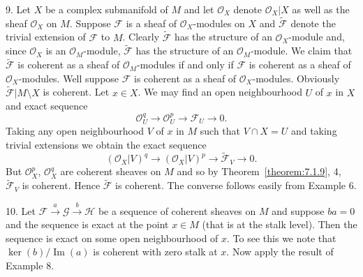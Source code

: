 9. Let $X$ be a complex submanifold of $M$ and let $\mathcal{O}_X$ denote $\mathcal{O}_X|X$ as well as the sheaf $\mathcal{O}_X$ on $M$. Suppose $\mathcal{F}$ is a sheaf of $\mathcal{O}_X$-modules on $X$ and $\widetilde{\mathcal{F}}$ denote the trivial extension of $\mathcal{F}$ to $M$. Clearly $\widetilde{\mathcal{F}}$ has the structure of an $\mathcal{O}_X$-module and, since $\mathcal{O}_X$ is an $\mathcal{O}_M$-module, $\widetilde{\mathcal{F}}$ has the structure of an $\mathcal{O}_M$-module. We claim that $\widetilde{\mathcal{F}}$ is coherent as a sheaf of $\mathcal{O}_M$-modules if and only if $\mathcal{F}$ is coherent as a sheaf of $\mathcal{O}_X$-modules. Well suppose $\mathcal{F}$ is coherent as a sheaf of $\mathcal{O}_X$-modules. Obviously $\widetilde{\mathcal{F}}|M\setminus X$ is coherent. Let $x\in X$. We may find an open neighbourhood $U$ of $x$ in $X$ and exact sequence
\[
\mathcal{O}_U^q\to\mathcal{O}_U^p\to\mathcal{F}_U\to0.
\]
Taking any open neighbourhood $V$ of $x$ in $M$ such that $V\cap X=U$ and taking trivial extensions we obtain the exact sequence
\[
(\mathcal{O}_X|V)^q\to(\mathcal{O}_X|V)^p\to\widetilde{\mathcal{F}}_V\to0.
\]
But $\mathcal{O}_X^p$, $\mathcal{O}_X^q$ are coherent sheaves on $M$ and so by Theorem~\ref{theorem:7.1.9}, 4, $\widetilde{\mathcal{F}}_V$ is coherent. Hence $\widetilde{\mathcal{F}}$ is coherent. The converse follows easily from Example 6.

10. Let $\mathcal{F}\xrightarrow{a}\mathcal{G}\xrightarrow{b}\mathcal{H}$ be a sequence of coherent sheaves on $M$ and suppose $ba=0$ and the sequence is exact at the point $x\in M$ (that is at the stalk level). Then the sequence is exact on some open neighbourhood of $x$. To see this we note that $\ker(b)/\operatorname{Im}(a)$ is coherent with zero stalk at $x$. Now apply the result of Example 8.
